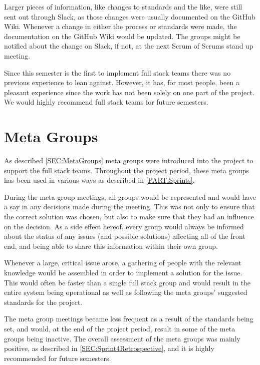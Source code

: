 Larger pieces of information, like changes to standards and the like, were still sent out through Slack, as those changes were usually documented on the GitHub Wiki.
Whenever a change in either the process or standards were made, the documentation on the GitHub Wiki would be updated. 
The groups might be notified about the change on Slack, if not, at the next Scrum of Scrums stand up meeting.

Since this semester is the first to implement full stack teams there was no previous experience to lean against. 
However, it has, for most people, been a pleasant experience since the work has not been solely on one part of the project.
We would highly recommend full stack teams for future semesters.

\section{Meta Groups}
As described \autoref{SEC:MetaGroups} meta groups were introduced into the project to support the full stack teams.
Throughout the project period, these meta groups has been used in various ways as described in \autoref{PART:Sprints}. 

During the meta group meetings, all groups would be represented and would have a say in any decisions made during the meeting.
This was not only to ensure that the correct solution was chosen, but also to make sure that they had an influence on the decision.
As a side effect hereof, every group would always be informed about the status of any issues (and possible solutions) affecting all of the front end, and being able to share this information within their own group.

Whenever a large, critical issue arose, a gathering of people with the relevant knowledge would be assembled in order to implement a solution for the issue. 
This would often be faster than a single full stack group and would result in the entire system being operational as well as following the meta groups' suggested standards for the project.
  
The meta group meetings became less frequent as a result of the standards being set, and would, at the end of the project period, result in some of the meta groups being inactive.
The overall assessment of the meta groups was mainly positive, as described in \autoref{SEC:Sprint4Retrospective}, and it is highly recommended for future semesters.
